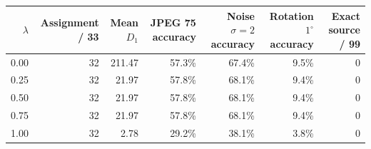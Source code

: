 \begin{tabular}{rrrrrrr}
\toprule
\textbf{$\lambda$} & \textbf{Assignment / 33} & \textbf{Mean $D_1$} & \textbf{JPEG 75 accuracy} & \textbf{Noise $\sigma=2$ accuracy} & \textbf{Rotation $1^\circ$ accuracy} & \textbf{Exact source / 99} \\
\midrule
0.00 & 32 & 211.47 & 57.3\% & 67.4\% & 9.5\% & 0 \\
0.25 & 32 & 21.97 & 57.8\% & 68.1\% & 9.4\% & 0 \\
0.50 & 32 & 21.97 & 57.8\% & 68.1\% & 9.4\% & 0 \\
0.75 & 32 & 21.97 & 57.8\% & 68.1\% & 9.4\% & 0 \\
1.00 & 32 & 2.78 & 29.2\% & 38.1\% & 3.8\% & 0 \\
\bottomrule
\end{tabular}

